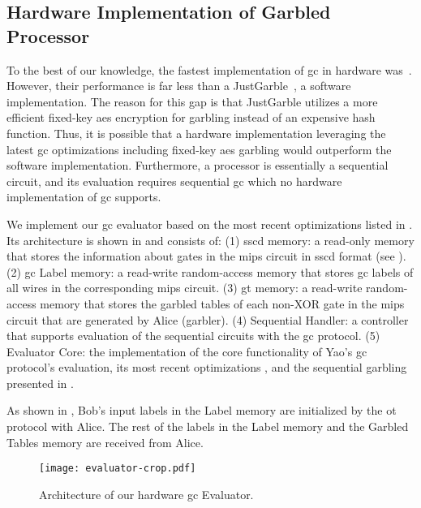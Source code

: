 \subsection{Hardware Implementation of Garbled Processor} \label{ssec:processor-hardware}
To the best of our knowledge, the fastest implementation of \acrshort{gc} in hardware was~\cite{jarvinen2010garbled}.
However, their performance is far less than a JustGarble~\cite{bellare2013efficient}, a software implementation.
The reason for this gap is that JustGarble utilizes a more efficient fixed-key \acrshort{aes} encryption for garbling instead of an expensive hash function.
Thus, it is possible that a hardware implementation leveraging the latest \acrshort{gc} optimizations including fixed-key \acrshort{aes} garbling would outperform the software implementation.
Furthermore, a processor is essentially a sequential circuit, and its evaluation requires sequential \acrshort{gc} which no hardware implementation of \acrshort{gc} supports.

We implement our \acrshort{gc} evaluator based on the most recent optimizations listed in .
Its architecture is shown in  and consists of:
(1) \acrfull{sscd} memory: a read-only memory that stores the information about gates in the \gls{mips} circuit in \acrshort{sscd} format (see ).
(2) \acrshort{gc} Label memory: a read-write random-access memory that stores \acrshort{gc} labels of all wires in the corresponding \gls{mips} circuit.
(3) \acrfull{gt} memory: a read-write random-access memory that stores the garbled tables of each non-XOR gate in the \gls{mips} circuit that are generated by Alice (garbler).
(4) Sequential Handler: a controller that supports evaluation of the sequential circuits with the \acrshort{gc} protocol.
(5) Evaluator Core: the implementation of the core functionality of Yao’s \acrshort{gc} protocol's evaluation, its most recent optimizations \cite{kolesnikov2008improved, bellare2013efficient, zahur2015two}, and the sequential garbling presented in .

As shown in , Bob's input labels in the Label memory are initialized by the \acrshort{ot} protocol with Alice.
The rest of the labels in the Label memory and the Garbled Tables memory are received from Alice.

\begin{figure}
\centering
\texttt{[image: evaluator-crop.pdf]}
\caption{Architecture of our hardware \acrshort{gc} Evaluator.}
\label{fig:evaluator}
\end{figure}

